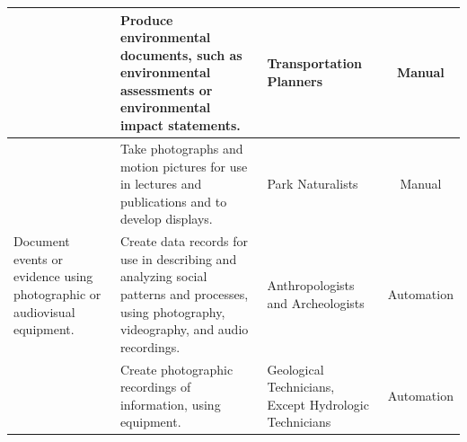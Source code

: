 \begin{tabular}{|l|p{15cm}|l|c|}
& Produce environmental documents, such as environmental assessments or environmental impact statements. &
Transportation Planners & Manual \\ \hline


\multirow{3}{*}{Document events or evidence using photographic or audiovisual equipment.} &
Take photographs and motion pictures for use in lectures and publications and to develop displays. &
Park Naturalists & Manual \\ \cline{2-4}

& Create data records for use in describing and analyzing social patterns and processes, using photography, videography, and audio recordings. &
Anthropologists and Archeologists & Automation \\ \cline{2-4}

& Create photographic recordings of information, using equipment. &
Geological Technicians, Except Hydrologic Technicians & Automation \\ \hline

\end{tabular}